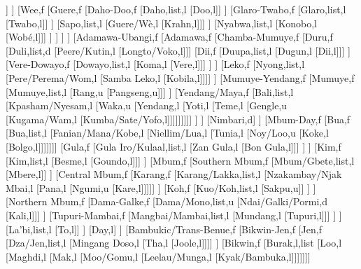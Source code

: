 \documentclass[landscape]{standalone}
\begin{document}
\begin{forest}
								[Tajausohn,l]]
							]
							[Wee,f
								[Guere,f
									[Daho-Doo,f
										[Daho,list,l
										[Doo,l]]
									]
									[Glaro-Twabo,f
										[Glaro,list,l
										[Twabo,l]]
									]
									[Sapo,list,l
									[Guere/Wè,l
									[Krahn,l]]]
								]
								[Nyabwa,list,l
								[Konobo,l
								[Wobé,l]]]
							]
						]
					]
				]
				[Adamawa-Ubangi,f
					[Adamawa,f
						[Chamba-Mumuye,f
							[Duru,f
								[Duli,list,d
								[Peere/Kutin,l
								[Longto/Voko,l]]]
								[Dii,f
									[Duupa,list,l
									[Dugun,l
									[Dii,l]]]
								]
								[Vere-Dowayo,f
									[Dowayo,list,l
									[Koma,l
									[Vere,l]]]
								]
							]
							[Leko,f
								[Nyong,list,l
								[Pere/Perema/Wom,l
								[Samba  Leko,l
								[Kobila,l]]]]
							]
							[Mumuye-Yendang,f
								[Mumuye,f
									[Mumuye,list,l
									[Rang,u
									[Pangseng,u]]]
								]
								[Yendang/Maya,f
									[Bali,list,l
									[Kpasham/Nyesam,l
									[Waka,u
									[Yendang,l
									[Yoti,l
									[Teme,l
									[Gengle,u
									[Kugama/Wam,l
									[Kumba/Sate/Yofo,l]]]]]]]]]
								]
							]
							[Nimbari,d]
						]
						[Mbum-Day,f
							[Bua,f
								[Bua,list,l
								[Fanian/Mana/Kobe,l
								[Niellim/Lua,l
								[Tunia,l
								[Noy/Loo,u
								[Koke,l
								[Bolgo,l]]]]]]]
								[Gula,f
									[Gula Iro/Kulaal,list,l
									[Zan Gula,l
									[Bon Gula,l]]]
								]
							]
							[Kim,f
								[Kim,list,l
								[Besme,l
								[Goundo,l]]]
							]
							[Mbum,f
								[Southern Mbum,f
									[Mbum/Gbete,list,l
									[Mbere,l]]
								]
								[Central Mbum,f
									[Karang,f
										[Karang/Lakka,list,l
										[Nzakambay/Njak Mbai,l
										[Pana,l
										[Ngumi,u
										[Kare,l]]]]]
									]
									[Koh,f
										[Kuo/Koh,list,l
										[Sakpu,u]]
									]
								]
								[Northern Mbum,f
									[Dama-Galke,f
										[Dama/Mono,list,u
										[Ndai/Galki/Pormi,d
										[Kali,l]]]
									]
									[Tupuri-Mambai,f
										[Mangbai/Mambai,list,l
										[Mundang,l
										[Tupuri,l]]]
									]
								]
								[La'bi,list,l
								[To,l]]
							]
							[Day,l]
						]
						[Bambukic/Trans-Benue,f
							[Bikwin-Jen,f
								[Jen,f
									[Dza/Jen,list,l
									[Mingang Doso,l
									[Tha,l
									[Joole,l]]]]
								]
								[Bikwin,f
									[Burak,l,list
									[Loo,l
									[Maghdi,l
									[Mak,l
									[Moo/Gomu,l
									[Leelau/Munga,l
									[Kyak/Bambuka,l]]]]]]]

\end{forest}
\end{document}
